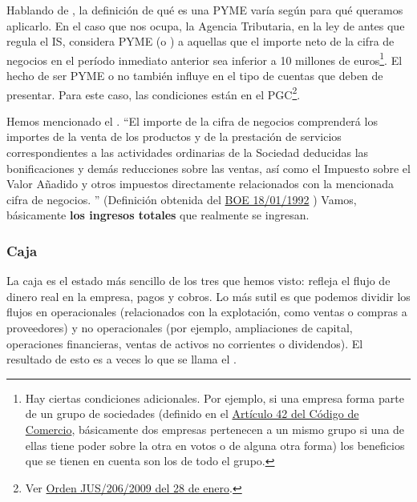 \documentclass[nochap,palatino,shortheader]{apuntes}
\begin{document}
Hablando de , la definición de qué es una PYME varía según para qué queramos aplicarlo. En el caso que nos ocupa, la Agencia Tributaria, en la ley de antes que regula el IS, considera PYME (o ) a aquellas que el importe neto de la cifra de negocios en el período inmediato anterior sea inferior a 10 millones de euros\footnote{Hay ciertas condiciones adicionales. Por ejemplo, si una empresa forma parte de un grupo de sociedades (definido en el \href{https://www.boe.es/buscar/act.php?id=BOE-A-1885-6627&tn=1&vd=&p=20150721}{Artículo 42 del Código de Comercio}, básicamente dos empresas pertenecen a un mismo grupo si una de ellas tiene poder sobre la otra en votos o de alguna otra forma) los beneficios que se tienen en cuenta son los de todo el grupo.}. El hecho de ser PYME o no también influye en el tipo de cuentas que deben de presentar. Para este caso, las condiciones están en el PGC\footnote{Ver \href{https://www.boe.es/boe/dias/2009/02/10/pdfs/BOE-A-2009-2276.pdf}{Orden JUS/206/2009 del 28 de enero}.}.



Hemos mencionado el . ``El importe de la cifra de negocios comprenderá los importes de la venta de los productos y de la prestación de servicios correspondientes a las actividades ordinarias de la Sociedad deducidas las bonificaciones y demás reducciones sobre las ventas, así como el Impuesto sobre el Valor Añadido y otros impuestos directamente relacionados con la mencionada cifra de negocios.  '' (Definición obtenida del \href{http://www.minhap.gob.es/Documentacion/Publico/NormativaDoctrina/Contabilidad%20y%20Auditoria%20de%20Empresas/Contabilidad/cifranegocA.pdf}{BOE 18/01/1992}
) Vamos, básicamente \textbf{los ingresos totales} que realmente se ingresan.

\subsubsection{Caja}

La caja es el estado más sencillo de los tres que hemos visto: refleja el flujo de dinero real en la empresa, pagos y cobros. Lo más sutil es que podemos dividir los flujos en operacionales (relacionados con la explotación, como ventas o compras a proveedores) y no operacionales (por ejemplo, ampliaciones de capital, operaciones financieras, ventas de activos no corrientes o dividendos). El resultado de esto es a veces lo que se llama el .
\end{document}
